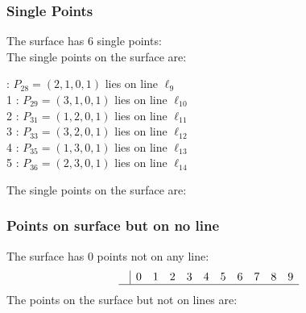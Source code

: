 \documentclass{article}
\begin{document}
{\subsubsection*{Single Points}
The surface has 6 single points:\\
The single points on the surface are:\\
\begin{multicols}{2}
 : $P_{28}=( 2, 1, 0, 1 )$ lies on line $\ell_{9}$\\
1 : $P_{29}=( 3, 1, 0, 1 )$ lies on line $\ell_{10}$\\
2 : $P_{31}=( 1, 2, 0, 1 )$ lies on line $\ell_{11}$\\
3 : $P_{33}=( 3, 2, 0, 1 )$ lies on line $\ell_{12}$\\
4 : $P_{35}=( 1, 3, 0, 1 )$ lies on line $\ell_{13}$\\
5 : $P_{36}=( 2, 3, 0, 1 )$ lies on line $\ell_{14}$\\
\end{multicols}
The single points on the surface are:\\
\subsubsection*{Points on surface but on no line}
The surface has 0 points not on any line:\\
$$
\begin{array}{r|*{10}{r}}
 & 0 & 1 & 2 & 3 & 4 & 5 & 6 & 7 & 8 & 9\\
\hline
\end{array}
$$
The points on the surface but not on lines are:\\
\begin{multicols}{2}
\noindent
\end{multicols}
}
\end{document}
